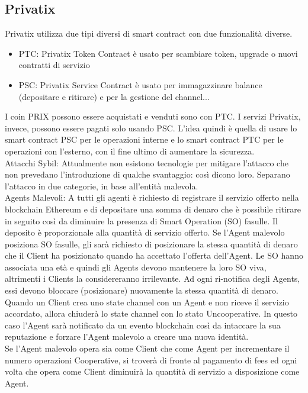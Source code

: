 \documentclass[]{article}
\begin{document}
	
	
	\subsection{Privatix}	
	Privatix utilizza due tipi diversi di smart contract con due funzionalità diverse.	
	\begin{itemize}
	\item PTC: Privatix Token Contract è usato per scambiare token, upgrade o nuovi contratti di servizio
	\item PSC: Privatix Service Contract è usato per immagazzinare balance (depositare e ritirare) e per la gestione del channel...
	\end{itemize}	
	I coin PRIX possono essere acquistati e venduti sono con PTC. I servizi Privatix, invece, possono essere pagati solo usando PSC.
	L’idea quindi è quella di usare lo smart contract PSC per le operazioni interne e lo smart contract PTC per le operazioni con l’esterno, con il fine ultimo di aumentare la sicurezza.\\	
	Attacchi Sybil: Attualmente non esistono tecnologie per mitigare l’attacco che non prevedano l’introduzione di qualche svantaggio: così dicono loro.
	Separano l’attacco in due categorie, in base all’entità malevola.	\\
	Agents Malevoli: A tutti gli agenti è richiesto di registrare il servizio offerto nella blockchain Ethereum e di depositare una somma di denaro che è possibile ritirare in seguito così da diminuire la presenza di Smart Operation (SO) fasulle. Il deposito è proporzionale alla quantità di servizio offerto.
	Se l’Agent malevolo posiziona SO fasulle, gli sarà richiesto di posizionare la stessa quantità di denaro che il Client ha posizionato quando ha accettato l’offerta dell’Agent.
	Le SO hanno associata una età e quindi gli Agents devono mantenere la loro SO viva, altrimenti i Clients la considereranno irrilevante.
	Ad ogni ri-notifica degli Agents, essi devono bloccare (posizionare) nuovamente la stessa quantità di denaro.\\	
	Quando un Client crea uno state channel con un Agent e non riceve il servizio accordato, allora chiuderà lo state channel con lo stato Uncooperative. In questo caso l’Agent sarà notificato da un evento blockchain così da intaccare la sua reputazione e forzare l’Agent malevolo a creare una nuova identità.\\	
	Se l’Agent malevolo opera sia come Client che come Agent per incrementare il numero operazioni Cooperative, si troverà di fronte al pagamento di fees ed ogni volta che opera come Client diminuirà la quantità di servizio a disposizione come Agent.\\	
\end{document}
